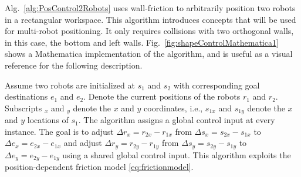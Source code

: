 \begin{figure*}
\caption{\label{fig:shapeControlMathematica1}{Frames from an implementation of Alg.\ \ref{alg:PosControl2Robots}: two robot positioning using walls with infinite friction. The algorithm only requires friction along the bottom and right walls.
Robot initial positions are shown by a crosshair, and final positions by a circled crosshair.  Dashed lines show the shortest route if robots could be controlled independently.  Solid arrows show path given by  Alg.\ \ref{alg:PosControl2Robots}.
Online demonstration and source code at \citep{Shahrokhi2015mathematicaParticle}.
}
}
\end{figure*}

Alg.~\ref{alg:PosControl2Robots} uses wall-friction to arbitrarily position two robots in a rectangular workspace.  This algorithm  introduces concepts that will be used for multi-robot positioning. It only requires collisions with two orthogonal walls, in this case, the bottom and left walls. Fig.~\ref{fig:shapeControlMathematica1} shows a Mathematica implementation of the algorithm, and is useful as a visual reference for the following description.

Assume two robots are initialized at $s_1$ and $s_2$ with corresponding goal destinations $e_1$ and $e_2$. 
Denote the current positions of the robots  $r_1$ and $r_2$. 
Subscripts $_x$ and $_y$ denote the $x$ and $y$ coordinates, i.e., $s_{1x}$ and $s_{1y}$ denote the $x$ and $y$ locations of $s_1$. 
The algorithm assigns a global control input at every instance.
The goal is to adjust 
 $\Delta r_x = r_{2x}-r_{1x}$ from $\Delta s_x = s_{2x}-s_{1x}$ to $\Delta e_x = e_{2x}-e_{1x}$ and  adjust 
 $\Delta r_y = r_{2y}-r_{1y}$ from $\Delta s_y = s_{2y}-s_{1y}$ to $\Delta e_y = e_{2y}-e_{1y}$ using a shared global control input. 
 This algorithm exploits the position-dependent friction model \eqref{eq:frictionmodel}.

